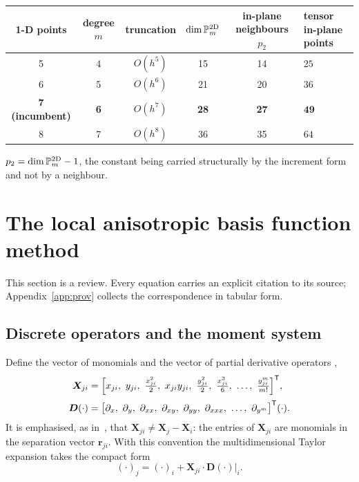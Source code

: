 \documentclass[11pt,a4paper]{article}
\newcommand{\rji}{\bm{r}_{ji}}
\begin{document}
\begin{center}\small
\begin{tabularx}{\textwidth}{@{}cccccX@{}}
\toprule
\textbf{1-D points} & \textbf{degree $m$} & \textbf{truncation} &
$\dim\mathbb P_m^{2\rm D}$ & \textbf{in-plane neighbours $p_2$} &
\textbf{tensor in-plane points}\\
\midrule
5 & 4 & $O(h^{5})$ & 15 & 14 & $25$\\
6 & 5 & $O(h^{6})$ & 21 & 20 & $36$\\
\textbf{7 (incumbent)} & \textbf{6} & $O(h^{7})$ & \textbf{28} & \textbf{27} &
$\bm{49}$\\
8 & 7 & $O(h^{8})$ & 36 & 35 & $64$\\
\bottomrule
\end{tabularx}
\end{center}

\noindent $p_2=\dim\mathbb P_m^{2\rm D}-1$, the constant being carried structurally by
the increment form and not by a neighbour.

\section{The local anisotropic basis function method}
\label{sec:labfm}

This section is a review. Every equation carries an explicit citation to its source;
Appendix~\ref{app:prov} collects the correspondence in tabular form.

\subsection{Discrete operators and the moment system}

Define the vector of monomials and the vector of partial derivative operators
\cite[Eqs.~(1),(2)]{KLN2020}, \cite[Eqs.~(1),(2)]{KL2021}
\begin{align}
\bm X_{ji}&=\Bigl[x_{ji},\ y_{ji},\ \tfrac{x_{ji}^{2}}{2},\ x_{ji}y_{ji},\
\tfrac{y_{ji}^{2}}{2},\ \tfrac{x_{ji}^{3}}{6},\ \dots,\ \tfrac{y_{ji}^{m}}{m!}
\Bigr]^{\mathsf T},
\label{eq:X}\\[0.2em]
\bm D(\cdot)&=\bigl[\partial_x,\ \partial_y,\ \partial_{xx},\ \partial_{xy},\
\partial_{yy},\ \partial_{xxx},\ \dots,\ \partial_{y^m}\bigr]^{\mathsf T}(\cdot).
\label{eq:D}
\end{align}
It is emphasised, as in~\cite{KLN2020}, that $\bm X_{ji}\neq\bm X_j-\bm X_i$: the
entries of $\bm X_{ji}$ are monomials in the separation vector $\rji$. With this
convention the multidimensional Taylor expansion takes the compact form
\cite[Eq.~(3)]{KLN2020}
\begin{equation}
(\cdot)_j=(\cdot)_i+\bm X_{ji}\cdot\bm D(\cdot)\big|_i .
\label{eq:taylor}
\end{equation}
\end{document}
